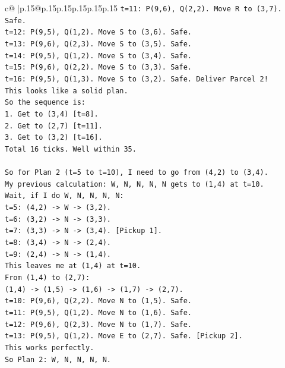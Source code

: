 \documentclass{article}
\begin{document}
{\begin{supertabular}{c@{$\;$}|p{.15\linewidth}@{}p{.15\linewidth}p{.15\linewidth}p{.15\linewidth}p{.15\linewidth}p{.15\linewidth}}
{{{\texttt{t=11: P(9,6), Q(2,2). Move R to (3,7). Safe.} \\
\texttt{t=12: P(9,5), Q(1,2). Move S to (3,6). Safe.} \\
\texttt{t=13: P(9,6), Q(2,3). Move S to (3,5). Safe.} \\
\texttt{t=14: P(9,5), Q(1,2). Move S to (3,4). Safe.} \\
\texttt{t=15: P(9,6), Q(2,2). Move S to (3,3). Safe.} \\
\texttt{t=16: P(9,5), Q(1,3). Move S to (3,2). Safe. Deliver Parcel 2!} \\
\texttt{This looks like a solid plan.} \\
\texttt{So the sequence is:} \\
\texttt{1. Get to (3,4) {[}t=8{]}.} \\
\texttt{2. Get to (2,7) {[}t=11{]}.} \\
\texttt{3. Get to (3,2) {[}t=16{]}.} \\
\texttt{Total 16 ticks. Well within 35.} \\
\\ 
\texttt{So for Plan 2 (t=5 to t=10), I need to go from (4,2) to (3,4).} \\
\texttt{My previous calculation: W, N, N, N, N gets to (1,4) at t=10.} \\
\texttt{Wait, if I do W, N, N, N, N:} \\
\texttt{t=5: (4,2) {-}> W {-}> (3,2).} \\
\texttt{t=6: (3,2) {-}> N {-}> (3,3).} \\
\texttt{t=7: (3,3) {-}> N {-}> (3,4). {[}Pickup 1{]}.} \\
\texttt{t=8: (3,4) {-}> N {-}> (2,4).} \\
\texttt{t=9: (2,4) {-}> N {-}> (1,4).} \\
\texttt{This leaves me at (1,4) at t=10.} \\
\texttt{From (1,4) to (2,7):} \\
\texttt{(1,4) {-}> (1,5) {-}> (1,6) {-}> (1,7) {-}> (2,7).} \\
\texttt{t=10: P(9,6), Q(2,2). Move N to (1,5). Safe.} \\
\texttt{t=11: P(9,5), Q(1,2). Move N to (1,6). Safe.} \\
\texttt{t=12: P(9,6), Q(2,3). Move N to (1,7). Safe.} \\
\texttt{t=13: P(9,5), Q(1,2). Move E to (2,7). Safe. {[}Pickup 2{]}.} \\
\texttt{This works perfectly.} \\
\texttt{So Plan 2: W, N, N, N, N.} \\
}}}
\end{supertabular}}
\end{document}
